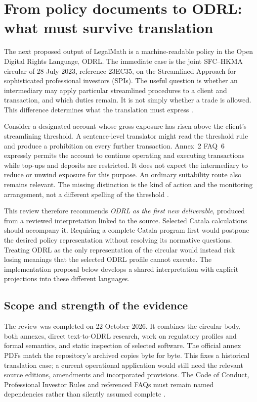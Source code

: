 \section{From policy documents to ODRL: what must survive translation}
\label{sec:odrl-review}

The next proposed output of LegalMath is a machine-readable policy in the
Open Digital Rights Language, ODRL. The immediate case is the joint
SFC--HKMA circular of 28 July 2023, reference 23EC35, on the Streamlined
Approach for sophisticated professional investors (SPIs). The useful question
is whether an intermediary may apply particular streamlined procedures to a
client and transaction, and which duties remain. It is not simply whether a
trade is allowed. This difference determines what the translation must express
\citep{sfcspi,sfcspiannex1,sfcspiannex2}.

Consider a designated account whose gross exposure has risen above the client's
streamlining threshold. A sentence-level translator might read the threshold
rule and produce a prohibition on every further transaction. Annex~2 FAQ~6
expressly permits the account to continue operating and executing transactions
while top-ups and deposits are restricted. It does not expect the intermediary
to reduce or unwind exposure for this purpose. An ordinary suitability route
also remains relevant. The missing distinction is the kind of action and the
monitoring arrangement, not a different spelling of the threshold
\citep[FAQ~6]{sfcspiannex2}.

This review therefore recommends \emph{ODRL as the first new deliverable},
produced from a reviewed interpretation linked to the source. Selected Catala
calculations should accompany it. Requiring a complete Catala program first
would postpone the desired policy representation without resolving its
normative questions. Treating ODRL as the only representation of the circular
would instead risk losing meanings that the selected ODRL profile cannot
execute. The implementation proposal below develops a shared interpretation
with explicit projections into these different languages.

\subsection{Scope and strength of the evidence}

The review was completed on 22 October 2026. It combines the circular body,
both annexes, direct text-to-ODRL research, work on regulatory profiles and
formal semantics, and static inspection of selected software. The official
annex PDFs match the repository's archived copies byte for byte. This fixes a
historical translation case; a current operational application would still
need the relevant source editions, amendments and incorporated provisions.
The Code of Conduct, Professional Investor Rules and referenced FAQs must
remain named dependencies rather than silently assumed complete
\citep{hkmaodrlsurvey2026}.

